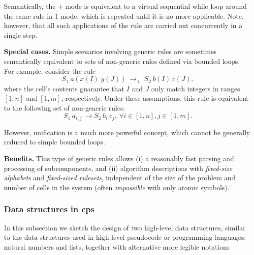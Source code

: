 Semantically, the $+$ mode is equivalent to a virtual sequential while loop around the same rule in $1$ mode, which is repeated until it is no more applicable.  Note, however, that all such applications of the rule are carried out concurrently in a single step.

\smallskip
\noindent
\textbf{Special cases.}
Simple scenarios involving generic rules are sometimes 
semantically equivalent to sets of non-generic rules defined via bounded loops.
For example, consider the rule
$$
S_1 ~ a(x(I) \; y(J)) ~ \rightarrow_+ ~ S_2 ~ b(I) ~ c(J),
$$
where the cell's contents guarantee that $I$ and $J$ 
only match integers in ranges $[1,n]$ and $[1,m]$, respectively.
Under these assumptions, 
this rule is equivalent to the following set of non-generic rules:
$$
S_1 ~ a_{i,j} ~ \rightarrow S_2 ~ b_i ~ c_j, ~ \forall i \in [1,n], j \in [1,m].
$$

However, unification is a much more powerful concept, 
which cannot be generally reduced to simple bounded loops.

\smallskip
\noindent
\textbf{Benefits.}
This type of generic rules allows (i) a reasonably fast parsing and processing of subcomponents, and
(ii) algorithm descriptions with \emph{fixed-size alphabets} and \emph{fixed-sized rulesets}, 
independent of the size of the problem and number of cells in the system (often \emph{impossible} with only atomic symbols).



\subsubsection{Data structures in \gls{cps}}\label{sec-data-structures}

In this subsection we sketch the design of two high-level data structures, 
similar to the data structures used in high-level pseudocode or %
programming languages:
natural numbers and lists, together with alternative more legible notations

